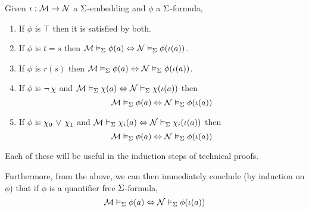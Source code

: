 \begin{prop}
    Given $\iota : \mathcal{M} \to \mathcal{N}$ a $\Sigma$-embedding and
    $\phi$ a $\Sigma$-formula,
    \begin{enumerate}
        \item If $\phi$ is $\top$ then it is satisfied by both.
        \item If $\phi$ is $t = s$ then 
            $\mathcal{M} \vDash_{\Sigma} \phi(a)  \Leftrightarrow \mathcal{N} \vDash_{\Sigma} \phi(\iota(a))$.
        \item If $\phi$ is $r(s)$ then 
            $\mathcal{M} \vDash_{\Sigma} \phi(a)  \Leftrightarrow \mathcal{N} \vDash_{\Sigma} \phi(\iota(a))$.
        \item If $\phi$ is $\neg\, \chi$ and 
            $\mathcal{M} \vDash_{\Sigma} \chi(a)  \Leftrightarrow \mathcal{N} \vDash_{\Sigma} \chi(\iota(a))$
            then \[\mathcal{M} \vDash_{\Sigma} \phi(a)  \Leftrightarrow \mathcal{N} \vDash_{\Sigma} \phi(\iota(a))\]
        \item If $\phi$ is $\chi_0 \, \lor \, \chi_1$ and 
            $\mathcal{M} \vDash_{\Sigma} \chi_i (a)  \Leftrightarrow \mathcal{N} \vDash_{\Sigma} \chi_i (\iota(a))$
            then \[\mathcal{M} \vDash_{\Sigma} \phi(a)  \Leftrightarrow \mathcal{N} \vDash_{\Sigma} \phi(\iota(a))\]
    \end{enumerate}
    Each of these will be useful in the induction steps of technical proofs.

    Furthermore, 
    from the above, we can then immediately conclude (by induction on $\phi$) 
    that if $\phi$ is a 
    quantifier free $\Sigma$-formula, 
    \[\mathcal{M} \vDash_{\Sigma} \phi(a)  \Leftrightarrow \mathcal{N} \vDash_{\Sigma} \phi(\iota(a))\]
\end{prop}
